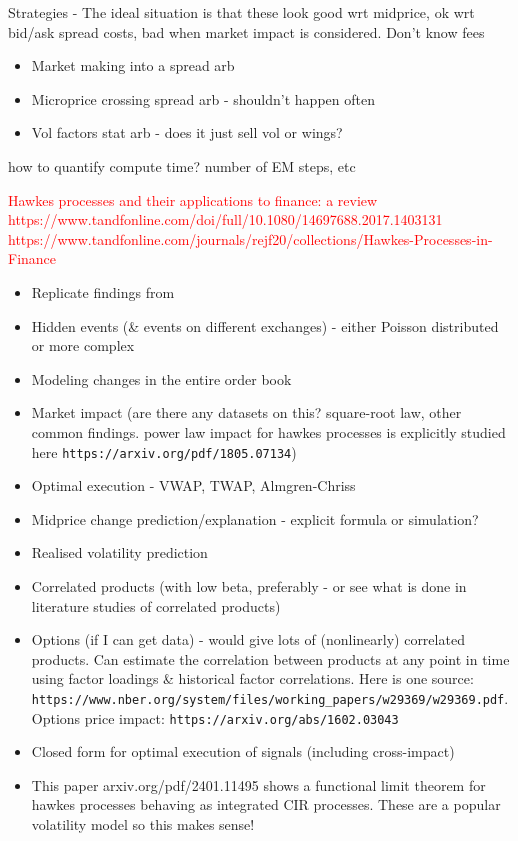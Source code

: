 \documentclass[honours,12pt]{unswthesis}
\numberwithin{equation}{section}
\begin{document}
Strategies - The ideal situation is that these look good wrt midprice, ok wrt bid/ask spread costs, bad when market impact is considered. Don't know fees
\begin{itemize}
	\item Market making into a spread arb
	\item Microprice crossing spread arb - shouldn't happen often
	\item Vol factors stat arb - does it just sell vol or wings?
\end{itemize}

how to quantify compute time? number of EM steps, etc

\textcolor{red}{Hawkes processes and their applications to finance: a review https://www.tandfonline.com/doi/full/10.1080/14697688.2017.1403131}
\textcolor{red}{https://www.tandfonline.com/journals/rejf20/collections/Hawkes-Processes-in-Finance}


\begin{itemize}
	\item Replicate findings from \cite{MorariuPatrichiPakkanen}
	\item Hidden events (\& events on different exchanges) - either Poisson distributed or more complex
	\item Modeling changes in the entire order book
	\item Market impact (are there any datasets on this? square-root law, other common findings. power law impact for hawkes processes is explicitly studied here \texttt{https://arxiv.org/pdf/1805.07134})
	\item Optimal execution - VWAP, TWAP, Almgren-Chriss
	\item Midprice change prediction/explanation - explicit formula or simulation?
	\item Realised volatility prediction
	\item Correlated products (with low beta, preferably - or see what is done in literature studies of correlated products)
	\item Options (if I can get data) - would give lots of (nonlinearly) correlated products. Can estimate the correlation between products at any point in time using factor loadings \& historical factor correlations. Here is one source: \texttt{https://www.nber.org/system/files/working_papers/w29369/w29369.pdf}. Options price impact: \texttt{https://arxiv.org/abs/1602.03043}
	\item Closed form for optimal execution of signals (including cross-impact)
	\item This paper arxiv.org/pdf/2401.11495 shows a functional limit theorem for hawkes processes behaving as integrated CIR processes. These are a popular volatility model so this makes sense!
\end{itemize}
\end{document}
